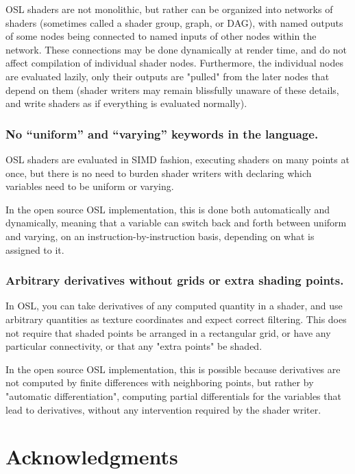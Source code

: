 \documentclass[11pt,letterpaper]{book}
\begin{document}
  OSL shaders are not monolithic, but rather can be organized into
  networks of shaders (sometimes called a shader group, graph, or DAG),
  with named outputs of some nodes being connected to named inputs of
  other nodes within the network.  These connections may be done
  dynamically at render time, and do not affect compilation of
  individual shader nodes.  Furthermore, the individual nodes are
  evaluated lazily, only their outputs are "pulled" from the later nodes
  that depend on them (shader writers may remain blissfully unaware of
  these details, and write shaders as if everything is evaluated
  normally).

\subsubsection*{No ``uniform'' and ``varying'' keywords in the language.}

  OSL shaders are evaluated in SIMD fashion, executing shaders on many
  points at once, but there is no need to burden shader writers with
  declaring which variables need to be uniform or varying.  

  In the open source OSL implementation, this is done both automatically
  and dynamically, meaning that a variable can switch back and forth
  between uniform and varying, on an instruction-by-instruction basis,
  depending on what is assigned to it.

\subsubsection*{Arbitrary derivatives without grids or extra shading points.}

  In OSL, you can take derivatives of any computed quantity in a shader,
  and use arbitrary quantities as texture coordinates and expect correct
  filtering.  This does not require that shaded points be arranged in a
  rectangular grid, or have any particular connectivity, or that any
  "extra points" be shaded.  

  In the open source OSL implementation, this is possible because
  derivatives are not computed by finite differences with neighboring
  points, but rather by "automatic differentiation", computing partial
  differentials for the variables that lead to derivatives, without any
  intervention required by the shader writer.


\vspace{0.5in}


\section*{Acknowledgments}
\end{document}
